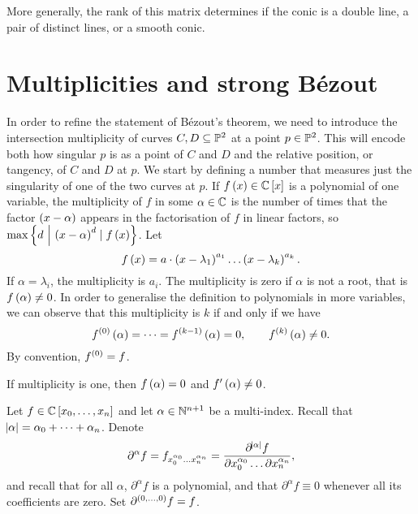 More generally, the rank of this matrix determines if the conic is a double line, a pair of distinct lines, or a smooth conic.

\pagebreak

\section{Multiplicities and strong B\'ezout}

In order to refine the statement of B\'ezout's theorem, we need to introduce the intersection multiplicity of curves $ C, D \subseteq \mathbb{P}^2 $ at a point $ p \in \mathbb{P}^2 $. This will encode both how singular $ p $ is as a point of $ C $ and $ D $ and the relative position, or tangency, of $ C $ and $ D $ at $ p $. We start by defining a number that measures just the singularity of one of the two curves at $ p $. If $ f\br{x} \in \CC\sbr{x} $ is a polynomial of one variable, the multiplicity of $ f $ in some $ \alpha \in \mathbb{C} $ is the number of times that the factor $ \br{x - \alpha} $ appears in the factorisation of $ f $ in linear factors, so $ \max\cbr{d \st \br{x - \alpha}^d \mid f\br{x}} $. Let
$$ f\br{x} = a \cdot \br{x - \lambda_1}^{a_1} \dots \br{x - \lambda_k}^{a_k}. $$
If $ \alpha = \lambda_i $, the multiplicity is $ a_i $. The multiplicity is zero if $ \alpha $ is not a root, that is $ f\br{\alpha} \ne 0 $. In order to generalise the definition to polynomials in more variables, we can observe that this multiplicity is $ k $ if and only if we have
$$ f^{\br{0}}\br{\alpha} = \dots = f^{\br{k - 1}}\br{\alpha} = 0, \qquad f^{\br{k}}\br{\alpha} \ne 0. $$
By convention, $ f^{\br{0}} = f $.

\begin{example*}
If multiplicity is one, then $ f\br{\alpha} = 0 $ and $ f'\br{\alpha} \ne 0 $.
\end{example*}

\begin{notation}
Let $ f \in \CC\sbr{x_0, \dots, x_n} $ and let $ \alpha \in \mathbb{N}^{n + 1} $ be a multi-index. Recall that $ \abs{\alpha} = \alpha_0 + \dots + \alpha_n $. Denote
$$ \partial^\alpha f = f_{x_0^{\alpha_0} \dots x_n^{\alpha_n}} = \dfrac{\partial^{\abs{\alpha}} f}{\partial x_0^{\alpha_0} \dots \partial x_n^{\alpha_n}}, $$
and recall that for all $ \alpha $, $ \partial^\alpha f $ is a polynomial, and that $ \partial^\alpha f \equiv 0 $ whenever all its coefficients are zero. Set $ \partial^{\br{0, \dots, 0}} f = f $.
\end{notation}

